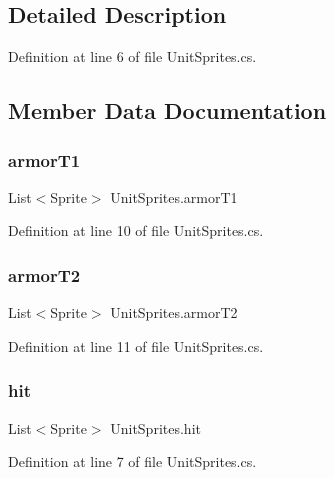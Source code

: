\subsection{Detailed Description}


Definition at line 6 of file Unit\+Sprites.\+cs.



\subsection{Member Data Documentation}
\mbox{\label{class_unit_sprites_a240fd076990a1d5415b0bf646811def5}} 
\subsubsection{\texorpdfstring{armorT1}{armorT1}}
{\footnotesize\ttfamily List$<$Sprite$>$ Unit\+Sprites.\+armor\+T1}



Definition at line 10 of file Unit\+Sprites.\+cs.

\mbox{\label{class_unit_sprites_a067a815643b14259b578d068a89fe847}} 
\subsubsection{\texorpdfstring{armorT2}{armorT2}}
{\footnotesize\ttfamily List$<$Sprite$>$ Unit\+Sprites.\+armor\+T2}



Definition at line 11 of file Unit\+Sprites.\+cs.

\mbox{\label{class_unit_sprites_a04dea1b07a4c9d2268e710338281d8f6}} 
\subsubsection{\texorpdfstring{hit}{hit}}
{\footnotesize\ttfamily List$<$Sprite$>$ Unit\+Sprites.\+hit}



Definition at line 7 of file Unit\+Sprites.\+cs.

